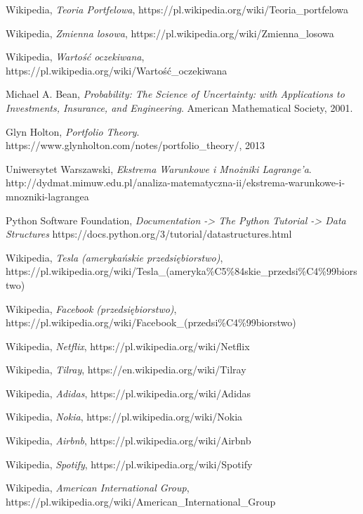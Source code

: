 \documentclass[magister]{dyplom}
\begin{document}
\begin{thebibliography}{19}
	Wikipedia,
	\emph{Teoria Portfelowa},
	https://pl.wikipedia.org/wiki/Teoria\_portfelowa

	Wikipedia,
	\emph{Zmienna losowa},
	https://pl.wikipedia.org/wiki/Zmienna\_losowa
	
	Wikipedia,
	\emph{Wartość oczekiwana},
	https://pl.wikipedia.org/wiki/Wartość\_oczekiwana
	
	Michael A. Bean,
	\emph{Probability: The Science of Uncertainty: with Applications to Investments, Insurance, and Engineering}.
	American Mathematical Society, 2001.
	
	Glyn Holton,
	\emph{Portfolio Theory}.
	https://www.glynholton.com/notes/portfolio\_theory/,
	2013

	Uniwersytet Warszawski,
	\emph{Ekstrema Warunkowe i Mnożniki Lagrange'a}.
	http://dydmat.mimuw.edu.pl/analiza-matematyczna-ii/ekstrema-warunkowe-i-mnozniki-lagrangea
	
	Python Software Foundation,
	\emph{Documentation -> The Python Tutorial -> Data Structures}
	https://docs.python.org/3/tutorial/datastructures.html

	Wikipedia,
	\emph{Tesla (amerykańskie przedsiębiorstwo)},\\
	https://pl.wikipedia.org/wiki/Tesla\_(ameryka\%C5\%84skie\_przedsi\%C4\%99biorstwo)
	
	Wikipedia,
	\emph{Facebook (przedsiębiorstwo)},\\
	https://pl.wikipedia.org/wiki/Facebook\_(przedsi\%C4\%99biorstwo)
	
	Wikipedia,
	\emph{Netflix},
	https://pl.wikipedia.org/wiki/Netflix
	
	Wikipedia,
	\emph{Tilray},
	https://en.wikipedia.org/wiki/Tilray
	
	Wikipedia,
	\emph{Adidas},
	https://pl.wikipedia.org/wiki/Adidas
	
	Wikipedia,
	\emph{Nokia},
	https://pl.wikipedia.org/wiki/Nokia

	Wikipedia,
	\emph{Airbnb},	
	https://pl.wikipedia.org/wiki/Airbnb
	
	Wikipedia,
	\emph{Spotify},
	https://pl.wikipedia.org/wiki/Spotify

	Wikipedia,
	\emph{American International Group},\\
	https://pl.wikipedia.org/wiki/American\_International\_Group
	
\end{thebibliography}
\end{document}
